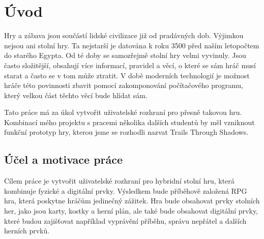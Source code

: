 \chapter{Úvod}
Hry a zábava jsou součástí lidské civilizace již od pradávných dob. Výjimkou nejsou ani stolní hry. Ta nejstarší je datována k roku 3500 před naším letopočtem do starého Egypta. Od té doby se samozřejmě stolní hry velmi vyvinuly. Jsou často složitější, obsahují více informací, pravidel a věcí, o které se sám hráč musí starat a často se v tom může ztratit. V době moderních technologií je možnost hráče této povinnosti zbavit pomocí zakomponování počítačového programu, který velkou část těchto věcí bude hlídat sám.

Tato práce má za úkol vytvořit uživatelské rozhraní pro přesně takovou hru. Kombinací mého projektu s pracemi několika dalších studentů by měl vzniknout funkční prototyp hry, kterou jsme se rozhodli nazvat Trails Through Shadows.

\section{Účel a motivace práce}
Cílem práce je vytvořit uživatelské rozhraní pro hybridní stolní hru, která kombinuje fyzické a digitální prvky. Výsledkem bude příběhově založená RPG hra, která poskytne hráčům jedinečný zážitek. Hra bude obsahovat prvky stolních her, jako jsou karty, kostky a herní plán, ale také bude obsahovat digitální prvky, které budou zajišťovat například vyprávění příběhu, správu nepřátel a dalších herních prvků.